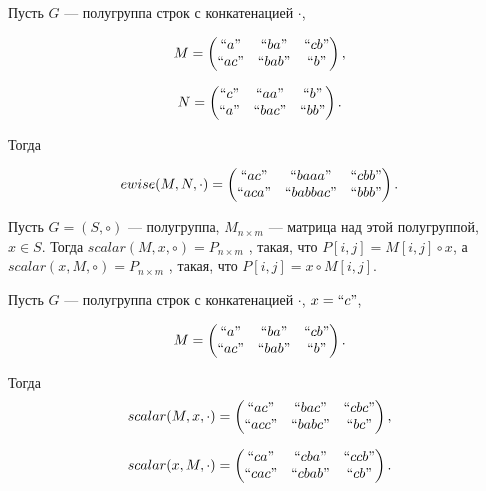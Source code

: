 \begin{example}

Пусть $G$ --- полугруппа строк с конкатенацией $\cdot$,

$$
M =
\begin{pmatrix}
``a"  & ``ba"  & ``cb" \\
``ac" & ``bab" & ``b"  \\
\end{pmatrix},
$$

$$
N =
\begin{pmatrix}
``c"  & ``aa"  & ``b" \\
``a" & ``bac" & ``bb"  \\
\end{pmatrix}.
$$

Тогда

$$
ewise(M,N, \cdot) =
\begin{pmatrix}
``ac"  & ``baaa"  & ``cbb" \\
``aca" & ``babbac" & ``bbb"  \\
\end{pmatrix}.
$$


\end{example}


\begin{definition}
Пусть $G = (S,\circ)$ --- полугруппа, $M_{n \times m}$ --- матрица над этой полугруппой, $x \in S$.
Тогда
$
scalar(M,x,\circ) = P_{n \times m}
$
, такая, что $P[i,j] = M[i,j] \circ x$, а
$
scalar(x,M,\circ) = P_{n \times m}
$
, такая, что $P[i,j] = x \circ M[i,j]$.

\end{definition}

\begin{example}

Пусть $G$ --- полугруппа строк с конкатенацией $\cdot$, $x = ``c"$,

$$
M =
\begin{pmatrix}
``a"  & ``ba"  & ``cb" \\
``ac" & ``bab" & ``b"  \\
\end{pmatrix}.
$$

Тогда
$$
scalar(M,x, \cdot) =
\begin{pmatrix}
``ac"  & ``bac"  & ``cbc" \\
``acc" & ``babc" & ``bc"  \\
\end{pmatrix},
$$

$$
scalar(x, M, \cdot) =
\begin{pmatrix}
``ca"  & ``cba"  & ``ccb" \\
``cac" & ``cbab" & ``cb"  \\
\end{pmatrix}.
$$

\end{example}


